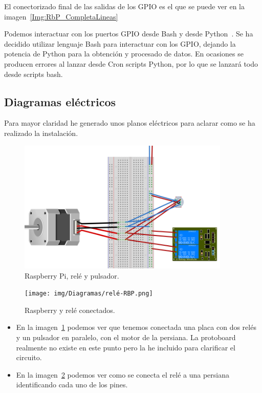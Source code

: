 El conectorizado final de las salidas de los GPIO es el que se puede ver en la imagen~\ref{Img:RbP_CompletaLineas}

Podemos interactuar con los puertos GPIO desde Bash y desde Python~\cite{misc:Python}. Se ha decidido utilizar lenguaje Bash para interactuar con los GPIO, dejando la potencia de Python para la obtención y procesado de datos. En ocasiones se producen errores al lanzar desde Cron scripts Python, por lo que se lanzará todo desde scripts bash.


\subsection{Diagramas eléctricos}
Para mayor claridad he generado unos planos eléctricos para aclarar como se ha realizado la instalación.

\begin{figure}
    \centering
    \includegraphics[width=0.9\textwidth]{img/Diagramas/rele-pulsador-motor.png}
    \caption{Raspberry Pi, relé y pulsador.} \label{Img:Relé+Pulsador+Rbp_Fritzing}
\end{figure}
\begin{figure}
    \centering
    \texttt{[image: img/Diagramas/relé-RBP.png]}
    \caption{Raspberry y relé conectados.} \label{Img:Relé+Rbp_Fritzing}
\end{figure}

\begin{itemize}
    \item En la imagen~\ref{Img:Relé+Pulsador+Rbp_Fritzing} podemos ver que tenemos conectada una placa con dos relés y un pulsador en paralelo, con el motor de la persiana. La protoboard realmente no existe en este punto pero la he incluido para clarificar el circuito.
    \item En la imagen~\ref{Img:Relé+Rbp_Fritzing} podemos ver como se conecta el relé a una persiana identificando cada uno de los pines.
\end{itemize}

